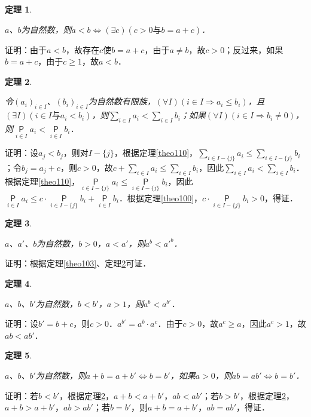 \documentclass[12pt, a4paper, oneside]{book}
\newtheorem{theo}{定理}
\begin{document}
			\begin{theo}\label{theo130}
				\hfill\par
				$a$、$b$为自然数，则$a<b\Leftrightarrow (\exists c)(c>0\text{与}b=a+c)$．
			\end{theo}
			证明：由于$a<b$，故存在$c$使$b=a+c$，由于$a\neq b$，故$c>0$；反过来，如果$b=a+c$，由于$c\geq 1$，故$a<b$．
			
			\begin{theo}\label{theo131}
				\hfill\par
				令$(a_i)_{i\in I}$、$(b_i)_{i\in I}$为自然数有限族，$(\forall I)(i\in I\Rightarrow a_i\leq b_i)$，且$(\exists I)(i\in I\text{与}a_i<b_i)$，则$\sum\limits_{i\in I}a_i<\sum\limits_{i\in I}b_i$；如果$(\forall I)(i\in I\Rightarrow b_i\neq 0)$，则$\mathop{\mathsf{P}}\limits_{i\in I}a_i<\mathop{\mathsf{P}}\limits_{i\in I}b_i$．
			\end{theo}
			证明：设$a_j<b_j$，则对$I-\{j\}$，根据定理\ref{theo110}，$\sum\limits_{i\in I-\{j\}}a_i\leq \sum\limits_{i\in I-\{j\}}b_i$；令$b_j=a_j+c$，则$c>0$，故$c+\sum\limits_{i\in I}a_i\leq \sum\limits_{i\in I}b_i$，因此$\sum\limits_{i\in I}a_i<\sum\limits_{i\in I}b_i$．
			根据定理\ref{theo110}，$\mathop{\mathsf{P}}\limits_{i\in I-\{j\}}a_i\leq \mathop{\mathsf{P}}\limits_{i\in I-\{j\}}b_i$，因此$\mathop{\mathsf{P}}\limits_{i\in I}a_i\leq c\cdot \mathop{\mathsf{P}}\limits_{i\in I-\{j\}}b_i+\mathop{\mathsf{P}}\limits_{i\in I}b_i$．根据定理\ref{theo100}，$c\cdot \mathop{\mathsf{P}}\limits_{i\in I-\{j\}}b_i>0$，得证．
			
			\begin{theo}\label{theo132}
				\hfill\par
				$a$、$a'$、$b$为自然数，$b>0$，$a<a'$，则$a^b<{a'}^b$．
			\end{theo}
			证明：根据定理\ref{theo103}、定理\ref{theo131}可证．
			
			\begin{theo}\label{theo133}
				\hfill\par
				$a$、$b$、$b'$为自然数，$b<b'$，$a>1$，则$a^b<a^{b'}$．
			\end{theo}
			证明：设$b'=b+c$，则$c>0$．$a^{b'}=a^b\cdot a^c$．由于$c>0$，故$a^c\geq a$，因此$a^c>1$，故$ab<ab'$．
			
			\begin{theo}\label{theo134}
				\hfill\par
				$a$、$b$、$b'$为自然数，则$a+b=a+b'\Leftrightarrow b=b'$，如果$a>0$，则$ab=ab'\Leftrightarrow b=b'$．
			\end{theo}
			证明：若$b<b'$，根据定理\ref{theo131}，$a+b<a+b'$，$ab<ab'$；若$b>b'$，根据定理\ref{theo131}，$a+b>a+b'$，$ab>ab'$；若$b=b'$，则$a+b=a+b'$，$ab=ab'$，得证．
			
\end{document}
